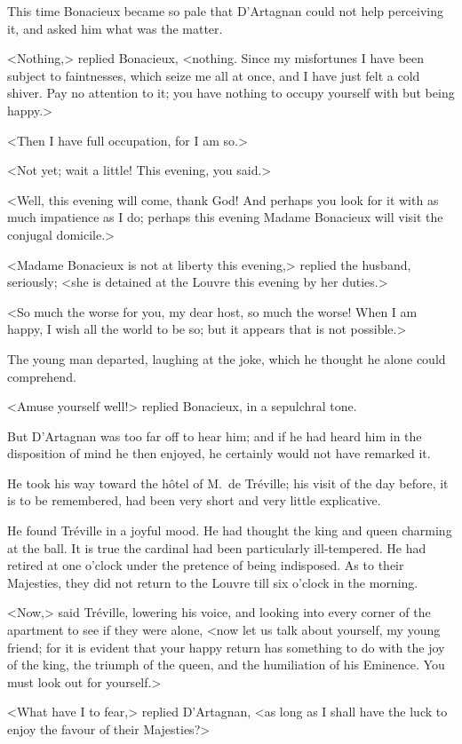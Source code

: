 This time Bonacieux became so pale that D'Artagnan could not help perceiving it, and asked him what was the matter. 

<Nothing,> replied Bonacieux, <nothing. Since my misfortunes I have been subject to faintnesses, which seize me all at once, and I have just felt a cold shiver. Pay no attention to it; you have nothing to occupy yourself with but being happy.> 

<Then I have full occupation, for I am so.> 

<Not yet; wait a little! This evening, you said.> 

<Well, this evening will come, thank God! And perhaps you look for it with as much impatience as I do; perhaps this evening Madame Bonacieux will visit the conjugal domicile.> 

<Madame Bonacieux is not at liberty this evening,> replied the husband, seriously; <she is detained at the Louvre this evening by her duties.> 

<So much the worse for you, my dear host, so much the worse! When I am happy, I wish all the world to be so; but it appears that is not possible.> 

The young man departed, laughing at the joke, which he thought he alone could comprehend. 

<Amuse yourself well!> replied Bonacieux, in a sepulchral tone. 

But D'Artagnan was too far off to hear him; and if he had heard him in the disposition of mind he then enjoyed, he certainly would not have remarked it. 

He took his way toward the hôtel of M.~de Tréville; his visit of the day before, it is to be remembered, had been very short and very little explicative. 

He found Tréville in a joyful mood. He had thought the king and queen charming at the ball. It is true the cardinal had been particularly ill-tempered. He had retired at one o'clock under the pretence of being indisposed. As to their Majesties, they did not return to the Louvre till six o'clock in the morning. 

<Now,> said Tréville, lowering his voice, and looking into every corner of the apartment to see if they were alone, <now let us talk about yourself, my young friend; for it is evident that your happy return has something to do with the joy of the king, the triumph of the queen, and the humiliation of his Eminence. You must look out for yourself.> 

<What have I to fear,> replied D'Artagnan, <as long as I shall have the luck to enjoy the favour of their Majesties?> 

